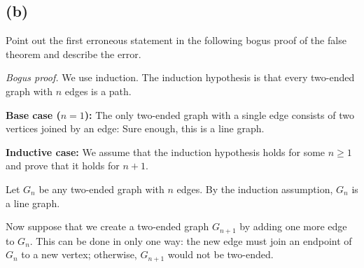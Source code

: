 \documentclass[14pt]{extarticle}
\begin{document}
\subsection{(b)}
Point out the first erroneous statement in the following bogus proof of the false theorem and describe the error.

{\it Bogus proof.} We use induction. The induction hypothesis is that every two-ended graph with $n$ edges is a path.

{\bf Base case ($n = 1$):} The only two-ended graph with a single edge consists of two vertices joined by an edge: Sure enough, this is a line graph.

{\bf Inductive case:} We assume that the induction hypothesis holds for some $n \geq 1$ and prove that it holds for $n + 1$. 

Let $G_n$ be any two-ended graph with $n$ edges. By the induction assumption, $G_n$ is a line graph.

Now suppose that we create a two-ended graph $G_{n+1}$ by adding one more edge to $G_n$. This can be done in only one way: the new edge must join an endpoint of $G_n$ to a new vertex; otherwise, $G_{n + 1}$ would not be two-ended.
\end{document}
